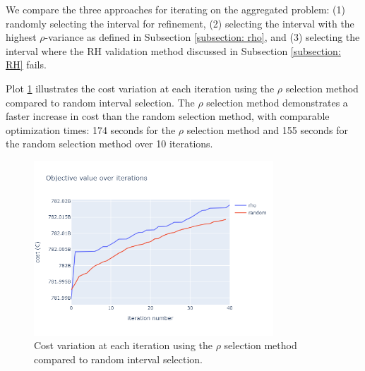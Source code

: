 \documentclass[smallextended,natbib]{svjour3}       %
\numberwithin{definition}{section}
\numberwithin{theorem}{section}
\numberwithin{proposition}{section}
\begin{document}



We compare the three approaches for iterating on the aggregated problem: 
(1) randomly selecting the interval for refinement, 
 (2) selecting the interval with the highest \(\rho\)-variance as defined in Subsection \ref{subsection: rho}, and 
 (3) selecting the interval where the RH validation method discussed in Subsection \ref{subsection: RH} fails. 

Plot \ref{fig:rho_vs_average} illustrates the cost variation at each iteration using the \(\rho\) selection method compared to random interval selection.
 The \(\rho\) selection method demonstrates a faster increase in cost than the random selection method, with comparable optimization times: 174 seconds for the \(\rho\) selection method 
 and 155 seconds for the random selection method over 10 iterations.

 \begin{figure}[htbp]
  \centering
  \includegraphics[width=0.8\textwidth]{images/rho_vas_average.png}
  \caption{Cost variation at each iteration using the \(\rho\) selection method compared to random interval selection.}
  \label{fig:rho_vs_average}
\end{figure}
\end{document}
